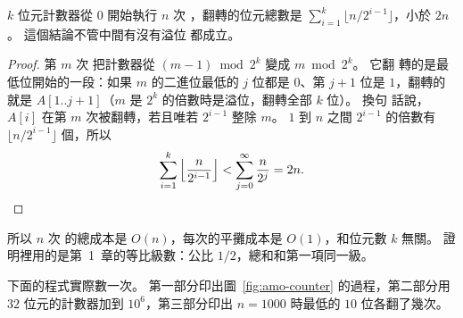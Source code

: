 \begin{theorem}
\label{thm:counter-aggregate}
$k$ 位元計數器從 $0$ 開始執行 $n$ 次 ，翻轉的位元總數是
$\sum_{i=1}^{k} \lfloor n / 2^{i-1} \rfloor$，小於 $2n$。 這個結論不管中間有沒有溢位
都成立。
\end{theorem}

\begin{proof}
第 $m$ 次  把計數器從 $(m - 1) \bmod 2^k$ 變成 $m \bmod 2^k$。 它翻
轉的是最低位開始的一段：如果 $m$ 的二進位最低的 $j$ 位都是 $0$、第 $j + 1$ 位是
$1$，翻轉的就是 $A[1..j+1]$（$m$ 是 $2^k$ 的倍數時是溢位，翻轉全部 $k$ 位）。 換句
話說，$A[i]$ 在第 $m$ 次被翻轉，若且唯若 $2^{i-1}$ 整除 $m$。 $1$ 到 $n$ 之間
$2^{i-1}$ 的倍數有 $\lfloor n / 2^{i-1} \rfloor$ 個，所以
\[
\sum_{i=1}^{k} \left\lfloor \frac{n}{2^{i-1}} \right\rfloor
< \sum_{j=0}^{\infty} \frac{n}{2^{j}} = 2n.
\qedhere
\]
\end{proof}

所以 $n$ 次  的總成本是 $O(n)$，每次的平攤成本是 $O(1)$，和位元數
$k$ 無關。 證明裡用的是第~1~章的等比級數：公比 $1/2$，總和和第一項同一級。

下面的程式實際數一次。 第一部分印出圖~\ref{fig:amo-counter} 的過程，第二部分用
$32$ 位元的計數器加到 $10^6$，第三部分印出 $n = 1000$ 時最低的 $10$ 位各翻了幾次。

